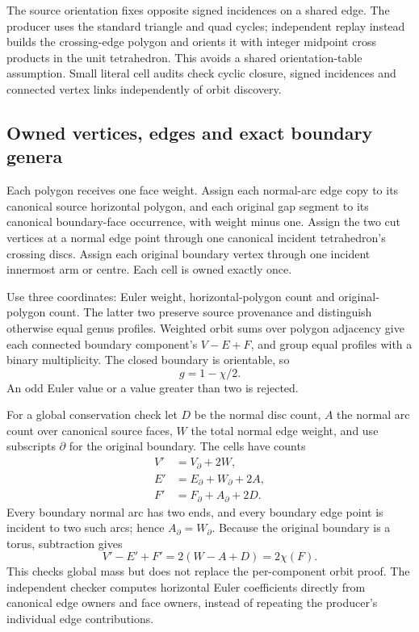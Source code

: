 The source orientation fixes opposite signed incidences on a shared edge.
The producer uses the standard triangle and quad cycles; independent replay
instead builds the crossing-edge polygon and orients it with integer midpoint
cross products in the unit tetrahedron. This avoids a shared orientation-table
assumption. Small literal cell audits check cyclic closure, signed incidences
and connected vertex links independently of orbit discovery.

\subsection{Owned vertices, edges and exact boundary genera}

Each polygon receives one face weight. Assign each normal-arc edge copy to
its canonical source horizontal polygon, and each original gap segment to
its canonical boundary-face occurrence, with weight minus one. Assign the
two cut vertices at a normal edge point through one canonical incident
tetrahedron's crossing discs. Assign each original boundary vertex through
one incident innermost arm or centre. Each cell is owned exactly once.

Use three coordinates: Euler weight, horizontal-polygon count and
original-polygon count. The latter two preserve source provenance and
distinguish otherwise equal genus profiles. Weighted orbit sums over polygon
adjacency give each connected boundary component's $V-E+F$, and group equal
profiles with a binary multiplicity. The closed boundary is orientable, so
\[
                   g=1-\chi/2.
\]
An odd Euler value or a value greater than two is rejected.

For a global conservation check let $D$ be the normal disc count, $A$ the
normal arc count over canonical source faces, $W$ the total normal edge
weight, and use subscripts $\partial$ for the original boundary. The cells
have counts
\[
\begin{split}
V'&=V_\partial+2W,\\
E'&=E_\partial+W_\partial+2A,\\
F'&=F_\partial+A_\partial+2D.
\end{split}
\]
Every boundary normal arc has two ends, and every boundary edge point is
incident to two such arcs; hence $A_\partial=W_\partial$.
Because the original boundary is a torus, subtraction gives
\[
                   V'-E'+F'=2(W-A+D)=2\chi(F).
\]
This checks global mass but does not replace the per-component orbit proof.
The independent checker computes horizontal Euler coefficients directly from
canonical edge owners and face owners, instead of repeating the producer's
individual edge contributions.

